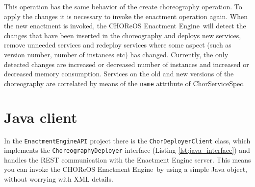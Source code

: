 \documentclass[a4paper, 10pt]{article}
\newcommand{\ee}{CHOReOS Enactment Engine}
\begin{document}
This operation has the same behavior of the create choreography operation.
To apply the changes it is necessary to invoke the enactment operation again.
When the new enactment is invoked, the \ee\ will detect the changes that have
been inserted in the choreography and deploys new services, remove unneeded services and redeploy
services where some aspect (such as version number, number of instances etc) has changed.
Currently, the only detected changes are increased or decreased number of instances
and increased or decreased memory consumption. Services on the old and new versions
of the choreography are correlated by means of the \texttt{name} attribute of ChorServiceSpec.

\section{Java client}
\label{sec:client}

In the \verb!EnactmentEngineAPI! project there is the \verb!ChorDeployerClient! class, which implements the \verb!ChoreographyDeployer! interface (Listing \ref{lst:java_interface}) and handles the REST communication with the Enactment Engine server. This means you can invoke the \ee\ by using a simple Java object, without worrying with XML details.
\end{document}
